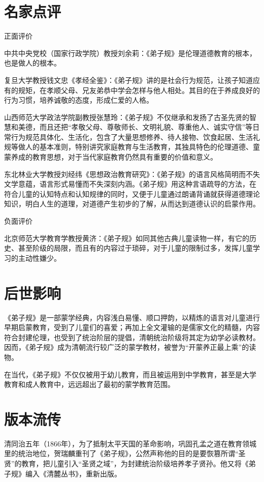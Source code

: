 \documentclass[a4paper,12pt,UTF8,twoside]{ctexbook}
\begin{document}
\chapter{名家点评}

正面评价

中共中央党校（国家行政学院）教授刘余莉：《弟子规》是伦理道德教育的根本，也是做人的根本。

复旦大学教授钱文忠《孝经全鉴》：《弟子规》讲的是社会行为规范，让孩子知道应有的规矩，在孝顺父母、兄友弟恭中学会怎样与他人相处。其目的在于养成良好的行为习惯，培养诚敬的态度，形成仁爱的人格。

山西师范大学政法学院副教授张慧玲：《弟子规》不仅继承和发扬了古圣先贤的智慧和美德，而且还把“孝敬父母、尊敬师长、文明礼貌、尊重他人、诚实守信”等日常行为规范具体化、生活化，包含了大量思想修养、待人接物、饮食起居、生活礼规等做人的基本准则，特别讲究家庭教育与生活教育，其独具特色的伦理道德、童蒙养成的教育思想，对于当代家庭教育仍然具有重要的价值和意义。

东北林业大学教授刘经纬《思想政治教育研究》：《弟子规》的语言风格简明而不失文学意蕴，语言形式易懂而不失深刻内涵。《弟子规》用这种言语疏导的方法，在符合儿童的认知特点和认知规律的同时，又便于儿童通过朗诵背诵就获得道德理论知识，明白人生的道理，对道德产生初步的了解，从而达到道德认识的启蒙作用。

负面评价

北京师范大学教育学教授黄济：《弟子规》如同其他古典儿童读物一样，有它的历史、甚至阶级的局限，而且有的内容过于琐碎，对于儿童的限制过多，发挥儿童学习的主动性嫌少。

\chapter{后世影响}

《弟子规》是一部蒙学经典，内容浅白易懂、顺口押韵，以精炼的语言对儿童进行早期启蒙教育，受到了儿童们的喜爱；再加上全文灌输的是儒家文化的精髓，内容符合封建伦理，也受到了统治阶层的提倡，清朝统治阶级将其定为幼学必读教材。因而，《弟子规》成为清朝流行较广泛的蒙学教材，被誉为“开蒙养正最上乘”的读物。

在当代，《弟子规》不仅仅被用于幼儿教育，而且被运用到中学教育，甚至是大学教育和成人教育中，远远超出了最初的蒙学教育范围。

\chapter{版本流传}

清同治五年（1866年），为了抵制太平天国的革命影响，巩固孔孟之道在教育领城里的统治地位，贺瑞麟重刊了《弟子规》，公然声称他的目的是要恢篡所谓“圣贤”的教育，把儿童引入“圣贤之域”，为封建统治阶级培养孝子贤孙。他又将《弟子规》编入《清麓丛书》，重新出版。
\end{document}
